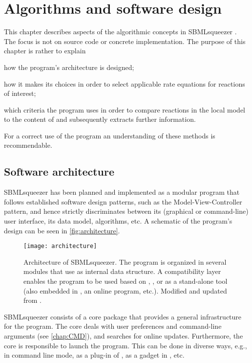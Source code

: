 \chapter{Algorithms and software design}

This chapter describes aspects of the algorithmic concepts in SBMLsqueezer \citep{Draeger2011a}.
The focus is not on source code or concrete implementation.
The purpose of this chapter is rather to explain
\begin{enumerate*}[label=\itshape\alph*\upshape)]
  \item how the program's architecture is designed;
  \item how it makes its choices in order to select applicable rate equations for reactions of interest;
  \item which criteria the program uses in order to compare reactions in the local model to the content of \SABIO 
\citep{Wittig2012} and subsequently extracts further information.
\end{enumerate*}
For a correct use of the program an understanding of these methods is recommendable.

\section{Software architecture}

SBMLsqueezer has been planned and implemented as a modular program that follows established software design patterns, such as the Model-View-Controller pattern, and hence strictly discriminates between its (graphical or command-line) user interface, its data model, algorithms, etc.
A schematic of the program's design can be seen in \vref{fig:architecture}.
\begin{figure}[htb]
  \centering
  \texttt{[image: architecture]}
  \caption[Architecture of SBMLsqueezer]{Architecture of SBMLsqueezer. The program is organized in several modules that use \JSBML as internal data structure. A compatibility layer enables the program to be used based on \libSBML, \CellDesigner, or as a stand-alone tool (also embedded in \Garuda, an online program, etc.). Modified and updated from \citet{Draeger2011a}.}
  \label{fig:architecture}
\end{figure}

SBMLsqueezer consists of a core package that provides a general infrastructure for the program.
The core deals with user preferences and command-line arguments (see \vref{chap:CMD}), and searches for online updates.
Furthermore, the core is responsible to launch the program.
This can be done in diverse ways, e.g., in command line mode, as a plug-in of \CellDesigner, as a gadget in \Garuda, etc.

